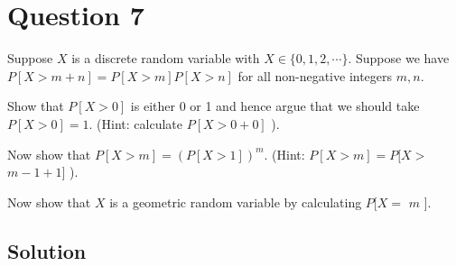 \section*{Question 7}

Suppose \( X \) is a discrete random variable with \( X \in \{0,1,2, \cdots \} \).
Suppose we have \( P[X>m+n]=P[X>m] P[X>n] \) for all non-negative integers \( m, n \).

Show that \( P[X>0] \) is either 0 or 1 and hence argue that we should take \( P[X>0]=1 \).
(Hint: calculate \( P[X>0+0] \) ).

Now show that \( P[X>m]=(P[X>1])^{m} \).
(Hint: \( P[X>m]=P[X> \) \( m-1+1] \) ).

Now show that \( X \) is a geometric random variable by calculating \( P[X= \) \( m \) ].

\subsection*{Solution}

